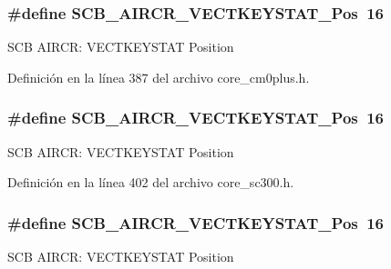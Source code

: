 \subsubsection[{\texorpdfstring{S\+C\+B\+\_\+\+A\+I\+R\+C\+R\+\_\+\+V\+E\+C\+T\+K\+E\+Y\+S\+T\+A\+T\+\_\+\+Pos}{SCB_AIRCR_VECTKEYSTAT_Pos}}]{\setlength{\rightskip}{0pt plus 5cm}\#define S\+C\+B\+\_\+\+A\+I\+R\+C\+R\+\_\+\+V\+E\+C\+T\+K\+E\+Y\+S\+T\+A\+T\+\_\+\+Pos~16}\hypertarget{group___c_m_s_i_s___s_c_b_gaec404750ff5ca07f499a3c06b62051ef}{}\label{group___c_m_s_i_s___s_c_b_gaec404750ff5ca07f499a3c06b62051ef}
S\+CB A\+I\+R\+CR\+: V\+E\+C\+T\+K\+E\+Y\+S\+T\+AT Position 

Definición en la línea 387 del archivo core\+\_\+cm0plus.\+h.

\subsubsection[{\texorpdfstring{S\+C\+B\+\_\+\+A\+I\+R\+C\+R\+\_\+\+V\+E\+C\+T\+K\+E\+Y\+S\+T\+A\+T\+\_\+\+Pos}{SCB_AIRCR_VECTKEYSTAT_Pos}}]{\setlength{\rightskip}{0pt plus 5cm}\#define S\+C\+B\+\_\+\+A\+I\+R\+C\+R\+\_\+\+V\+E\+C\+T\+K\+E\+Y\+S\+T\+A\+T\+\_\+\+Pos~16}\hypertarget{group___c_m_s_i_s___s_c_b_gaec404750ff5ca07f499a3c06b62051ef}{}\label{group___c_m_s_i_s___s_c_b_gaec404750ff5ca07f499a3c06b62051ef}
S\+CB A\+I\+R\+CR\+: V\+E\+C\+T\+K\+E\+Y\+S\+T\+AT Position 

Definición en la línea 402 del archivo core\+\_\+sc300.\+h.

\subsubsection[{\texorpdfstring{S\+C\+B\+\_\+\+A\+I\+R\+C\+R\+\_\+\+V\+E\+C\+T\+K\+E\+Y\+S\+T\+A\+T\+\_\+\+Pos}{SCB_AIRCR_VECTKEYSTAT_Pos}}]{\setlength{\rightskip}{0pt plus 5cm}\#define S\+C\+B\+\_\+\+A\+I\+R\+C\+R\+\_\+\+V\+E\+C\+T\+K\+E\+Y\+S\+T\+A\+T\+\_\+\+Pos~16}\hypertarget{group___c_m_s_i_s___s_c_b_gaec404750ff5ca07f499a3c06b62051ef}{}\label{group___c_m_s_i_s___s_c_b_gaec404750ff5ca07f499a3c06b62051ef}
S\+CB A\+I\+R\+CR\+: V\+E\+C\+T\+K\+E\+Y\+S\+T\+AT Position 

